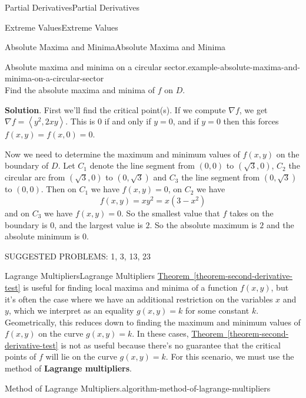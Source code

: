 \documentclass[10pt,]{book}
\newcommand{\terminology}[1]{\textbf{#1}}
\numberwithin{equation}{section}
\newcommand{\grad}{\nabla}
\newcommand{\dotprod}[1]{\left\langle #1 \right\rangle}
\begin{document}
\begin{chapterptx}{Partial Derivatives}{}{Partial Derivatives}{}{}
\begin{sectionptx}{Extreme Values}{}{Extreme Values}{}{}
\begin{subsectionptx}{Absolute Maxima and Minima}{}{Absolute Maxima and Minima}{}{}
\begin{example}{Absolute maxima and minima on a circular sector.}{example-absolute-maxima-and-minima-on-a-circular-sector}
\begin{equation*}
\end{equation*}
Find the absolute maxima and minima of \(f\) on \(D\).%
\par\smallskip%
\noindent\textbf{Solution}.\hypertarget{solution-192}{}\quad%
\hypertarget{p-1220}{}%
First we'll find the critical point(s). If we compute \(\grad f\), we get \(\grad f = \dotprod{y^{2}, 2xy}\). This is \(0\) if and only if \(y=0\), and if \(y=0\) then this forces \(f(x,y) = f(x,0) = 0\).%
\par
\hypertarget{p-1221}{}%
Now we need to determine the maximum and minimum values of \(f(x,y)\) on the boundary of \(D\). Let \(C_{1}\) denote the line segment from \((0,0)\) to \((\sqrt{3},0)\), \(C_{2}\) the circular arc from \((\sqrt{3},0)\) to \((0,\sqrt{3})\) and \(C_{3}\) the line segment from \((0,\sqrt{3})\) to \((0,0)\). Then on \(C_{1}\) we have \(f(x,y) = 0\), on \(C_{2}\) we have%
\begin{equation*}
f(x,y) = xy^{2} = x(3-x^{2})
\end{equation*}
and on \(C_{3}\) we have \(f(x,y) = 0\). So the smallest value that \(f\) takes on the boundary is \(0\), and the largest value is \(2\). So the absolute maximum is \(2\) and the absolute minimum is \(0\).%
\end{example}
\end{subsectionptx}
\hypertarget{p-1222}{}%
SUGGESTED PROBLEMS: 1, 3, 13, 23%
\end{sectionptx}
%
%
\typeout{************************************************}
\typeout{************************************************}
%
\begin{sectionptx}{Lagrange Multipliers}{}{Lagrange Multipliers}{}{}\label{section-lagrange-multipliers}
\hypertarget{p-1223}{}%
\hyperref[theorem-second-derivative-test]{Theorem~\ref{theorem-second-derivative-test}} is useful for finding local maxima and minima of a function \(f(x,y)\), but it's often the case where we have an additional restriction on the variables \(x\) and \(y\), which we interpret as an equality \(g(x,y) = k\) for some constant \(k\). Geometrically, this reduces down to finding the maximum and minimum values of \(f(x,y)\) on the curve \(g(x,y) = k\). In these cases, \hyperref[theorem-second-derivative-test]{Theorem~\ref{theorem-second-derivative-test}} is not as useful because there's no guarantee that the critical points of \(f\) will lie on the curve \(g(x,y) = k\). For this scenario, we must use the method of \terminology{Lagrange multipliers}.%
\begin{algorithm}{Method of Lagrange Multipliers.}{}{algorithm-method-of-lagrange-multipliers}%

\end{algorithm}
\end{sectionptx}
\end{chapterptx}
\end{document}
